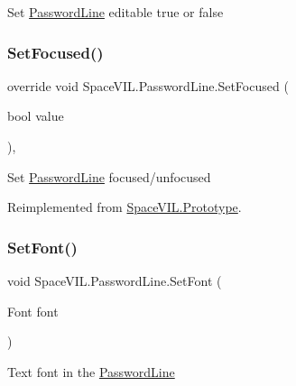 Set \mbox{\hyperlink{class_space_v_i_l_1_1_password_line}{Password\+Line}} editable true or false 

\mbox{\label{class_space_v_i_l_1_1_password_line_ac82ce0352c02dab703ac18e6d81798a5}} 
\subsubsection{\texorpdfstring{Set\+Focused()}{SetFocused()}}
{\footnotesize\ttfamily override void Space\+V\+I\+L.\+Password\+Line.\+Set\+Focused (\begin{DoxyParamCaption}\item[{bool}]{value }\end{DoxyParamCaption})\hspace{0.3cm}{\ttfamily [inline]}, {\ttfamily [virtual]}}



Set \mbox{\hyperlink{class_space_v_i_l_1_1_password_line}{Password\+Line}} focused/unfocused 



Reimplemented from \mbox{\hyperlink{class_space_v_i_l_1_1_prototype}{Space\+V\+I\+L.\+Prototype}}.

\mbox{\label{class_space_v_i_l_1_1_password_line_a39c41fdf3ef352cd2b51d5cee342dfa4}} 
\subsubsection{\texorpdfstring{Set\+Font()}{SetFont()}}
{\footnotesize\ttfamily void Space\+V\+I\+L.\+Password\+Line.\+Set\+Font (\begin{DoxyParamCaption}\item[{Font}]{font }\end{DoxyParamCaption})\hspace{0.3cm}{\ttfamily [inline]}}



Text font in the \mbox{\hyperlink{class_space_v_i_l_1_1_password_line}{Password\+Line}} 

